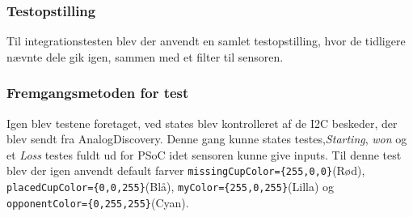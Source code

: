 \documentclass[Integrationstest/Integrationstest_main.tex]{subfiles}
\begin{document}
\subsubsection{Testopstilling}
Til integrationstesten blev der anvendt en samlet testopstilling, hvor de tidligere nævnte dele gik igen, sammen med et filter til sensoren.

\subsubsection{Fremgangsmetoden for test}
Igen blev testene foretaget, ved states blev kontrolleret af de I2C beskeder, der blev sendt fra AnalogDiscovery. Denne gang kunne states testes,\textit{Starting}, \textit{won} og et \textit{Loss} testes fuldt ud for PSoC idet sensoren kunne give inputs. Til denne test blev der igen anvendt default farver \lstinline|missingCupColor={255,0,0}|(Rød), \lstinline|placedCupColor={0,0,255}|(Blå), \lstinline|myColor={255,0,255}|(Lilla) og \lstinline|opponentColor={0,255,255}|(Cyan). 
\end{document}
